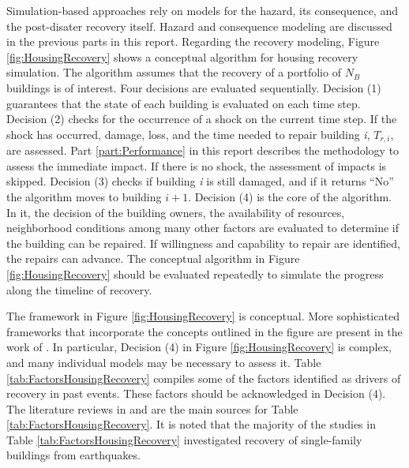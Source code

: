 Simulation-based approaches rely on models for the hazard, its consequence, and the post-disater recovery itself. Hazard and consequence modeling are discussed in the previous parts in this report. Regarding the recovery modeling, Figure \ref{fig:HousingRecovery} shows a conceptual algorithm for housing recovery simulation. The algorithm assumes that the recovery of a portfolio of $N_B$ buildings is of interest. Four decisions are evaluated sequentially. Decision (1) guarantees that the state of each building is evaluated on each time step. Decision (2) checks for the occurrence of a shock on the current time step. If the shock has occurred, damage, loss, and the time needed to repair building \textit{i}, $T_{r,i}$, are assessed. Part \ref{part:Performance} in this report describes the methodology to assess the immediate impact. If there is no shock, the assessment of impacts is skipped. Decision (3) checks if building \textit{i} is still damaged, and if it returns ``No'' the algorithm moves to building $i+1$. Decision (4) is the core of the algorithm. In it, the decision of the building owners, the availability of resources, neighborhood conditions among many other factors are evaluated to determine if the building can be repaired. If willingness and capability to repair are identified, the repairs can advance. The conceptual algorithm in Figure \ref{fig:HousingRecovery} should be evaluated repeatedly to simulate the progress along the timeline of recovery.\ 

The framework in Figure \ref{fig:HousingRecovery} is conceptual. More sophisticated frameworks that incorporate the concepts outlined in the figure are present in the work of \cite{Sutley2017a, Burton2018, costa2020housing}. In particular, Decision (4) in Figure \ref{fig:HousingRecovery} is complex, and many individual models may be necessary to assess it. Table \ref{tab:FactorsHousingRecovery} compiles some of the factors identified as drivers of recovery in past events. These factors should be acknowledged in Decision (4). The literature reviews in \cite{Costa2019thesis} and \cite{moradi2020recovus} are the main sources for Table \ref{tab:FactorsHousingRecovery}. It is noted that the majority of the studies in Table \ref{tab:FactorsHousingRecovery} investigated recovery of single-family buildings from earthquakes. \ 

